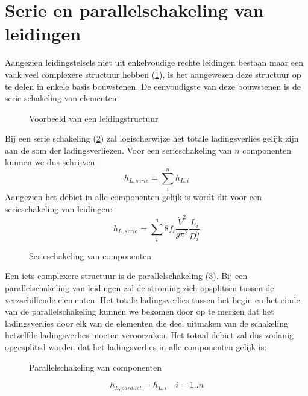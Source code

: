 	\section{Serie en parallelschakeling van leidingen}
	\label{sec:Serie en parallelschakeling van leidingen}
Aangezien leidingstelsels niet uit enkelvoudige rechte leidingen bestaan maar een vaak veel complexere structuur hebben (\ref{fig:leiding_structuur}), is het aangewezen deze structuur op te delen in enkele basis bouwstenen. De eenvoudigste van deze bouwstenen is de serie schakeling van elementen.
\begin{figure}
	\centering
	
	\caption{Voorbeeld van een leidingstructuur}
	\label{fig:leiding_structuur}
\end{figure}
Bij een serie schakeling (\ref{fig:serieschakeling}) zal logischerwijze het totale ladingsverlies gelijk zijn aan de som der ladingsverliezen. Voor een serieschakeling van $n$ componenten kunnen we dus schrijven:
\begin{equation}
h_{L,serie} = \sum_i^n h_{L,i}
\end{equation}
Aangezien het debiet in alle componenten gelijk is wordt dit voor een serieschakeling van leidingen:
\begin{equation}
	h_{L,serie} = \sum_i^n 8 f_i \frac{\dot{V}^2}{g \pi^2} \frac{L_i}{D^5_i}
	\label{eqn:ladingsverlies door leidingen in serie}
\end{equation}
\begin{figure}
	\centering
	
	\caption{Serieschakeling van componenten}
	\label{fig:serieschakeling}
\end{figure}
\npar
Een iets complexere structuur is de parallelschakeling (\ref{fig:parallelschakeling}). Bij een parallelschakeling van leidingen zal de stroming zich opsplitsen tussen de verzschillende elementen. Het totale ladingsverlies tussen het begin en het einde van de parallelschakeling kunnen we bekomen door op te merken dat het ladingsverlies door elk van de elementen die deel uitmaken van de schakeling hetzelfde ladingsverlies moeten veroorzaken. Het totaal debiet zal dus zodanig opgesplitsd worden dat het ladingsverlies in alle componenten gelijk is:
\begin{figure}
	\centering
	
	\caption{Parallelschakeling van componenten}
	\label{fig:parallelschakeling}
\end{figure}
\begin{equation}
	h_{L,parallel} = h_{L,i} \quad i=1..n
\end{equation}
